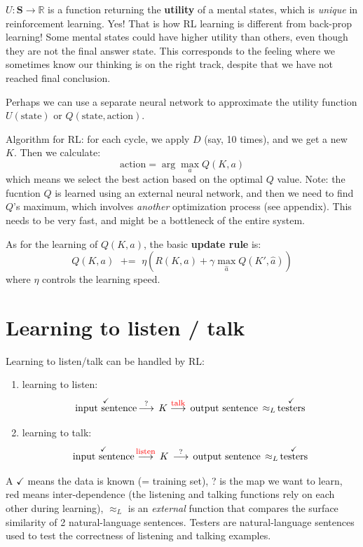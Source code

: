 \documentclass[12pt]{article}
\begin{document}
$ U: \mathbf{S} \rightarrow \mathbb{R} $ is a function returning the \textbf{utility} of a mental states, which is \textit{unique} in reinforcement learning.  Yes! That is how RL learning is different from back-prop learning!  Some mental states could have higher utility than others, even though they are not the final answer state.  This corresponds to the feeling where we sometimes know our thinking is on the right track, despite that we have not reached final conclusion.

Perhaps we can use a separate neural network to approximate the utility function $U(\mbox{state})$ or $Q(\mbox{state},\mbox{action})$.

Algorithm for RL:  for each cycle, we apply $D$ (say, 10 times), and we get a new $K$.  Then we calculate:
$$ \mbox{action} = \arg\max_a Q(K,a) $$
which means we select the best action based on the optimal $Q$ value.  Note:  the fucntion $Q$ is learned using an external neural network, and then we need to find $Q$'s maximum, which involves \textit{another} optimization process (see appendix).  This needs to be very fast, and might be a bottleneck of the entire system.

As for the learning of $Q(K,a)$, the basic \textbf{update rule} is:
$$ Q(K,a) \;\mbox{ += }\; \eta (R(K,a) + \gamma \max_{\hat{a}} Q(K',\hat{a})) $$
where $\eta$ controls the learning speed.

\section{Learning to listen / talk}
\label{sec:learning-to-listen-talk}

Learning to listen/talk can be handled by RL:

\begin{enumerate}
\item learning to listen:
$$ \stackrel{\checkmark}{\mbox{input sentence}} \, \stackrel{?}{\longrightarrow} \, K \stackrel{{\color{red}\mbox{\footnotesize talk}}}{\longrightarrow} \, \mbox{output sentence} \, \approx_L \, \stackrel{\checkmark}{\mbox{testers}} $$
\item learning to talk:
$$ \stackrel{\checkmark}{\mbox{input sentence}} \, \stackrel{{\color{red}\mbox{\footnotesize listen}}}{\longrightarrow} \, K \, \stackrel{?}{\longrightarrow} \, \mbox{output sentence} \, \approx_L \, \stackrel{\checkmark}{\mbox{testers}} $$
\end{enumerate}

A $\checkmark$ means the data is known (= training set), ? is the map we want to learn, {\color{red}red} means inter-dependence (the listening and talking functions rely on each other during learning), $\approx_L$ is an \textit{external} function that compares the surface similarity of 2 natural-language sentences.  Testers are natural-language sentences used to test the correctness of listening and talking examples.
\end{document}
